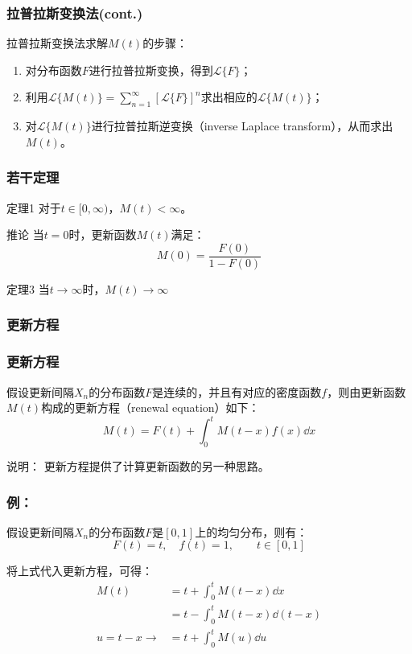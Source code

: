 \documentclass[t]{beamer}
\newcommand{\laplace}[2]{\mathcal{L}\{#1(#2)\}}
\newcommand{\LT}[1]{\mathcal{L}\{#1\}}
\begin{document}
\begin{frame}
  \frametitle{拉普拉斯变换法(cont.)}
  拉普拉斯变换法求解$M(t)$的步骤：
  \begin{enumerate}
      \item 对分布函数$F$进行拉普拉斯变换，得到$\LT{F}$；
      \item 利用$\laplace{M}{t}=\sum\limits^{\infty}_{n=1}[\LT{F}]^n$求出相应的$\laplace{M}{t}$；
      \item 对$\laplace{M}{t}$进行拉普拉斯逆变换（inverse Laplace transform），从而求出$M(t)$。
  \end{enumerate}
  

\end{frame}


\begin{frame}
  \frametitle{若干定理}
\begin{block}{定理1}
  对于$t\in [0,\infty)$，$M(t)<\infty$。
\end{block}
  
\begin{block}{推论}
  当$t=0$时，更新函数$M(t)$满足：
  \begin{equation*}
      M(0)=\frac{F(0)}{1-F(0)}
  \end{equation*}
\end{block}
\begin{block}{定理3}
  当$t\to  \infty$时，$M(t)\to \infty$
\end{block}
\end{frame}

\subsubsection{更新方程}
\begin{frame}
  \frametitle{更新方程}
  假设更新间隔$X_n$的分布函数$F$是连续的，并且有对应的密度函数$f$，则由更新函数$M(t)$构成的更新方程（renewal equation）如下：
  \begin{equation*}
      M(t)=F(t) +\int^{t}_0 M(t-x) f(x)\dd x 
  \end{equation*}
  
\begin{block}{说明：}
  更新方程提供了计算更新函数的另一种思路。
\end{block}
\end{frame}


\begin{frame}
  \frametitle{例：}
  假设更新间隔$X_n$的分布函数$F$是$[0,1]$上的均匀分布，则有：
  \[F(t)=t,\quad f(t)=1,\qquad t\in[0,1]\]

  将上式代入更新方程，可得：
  \[\begin{split}
      M(t)&=t+\int^{t}_0 M(t-x) \dd x\\
      &=t-\int^{t}_0 M(t-x)\dd (t-x)\\
      u=t-x\to &=t+\int^{t}_0 M(u)\dd u
  \end{split}\]
\end{frame}
\end{document}

